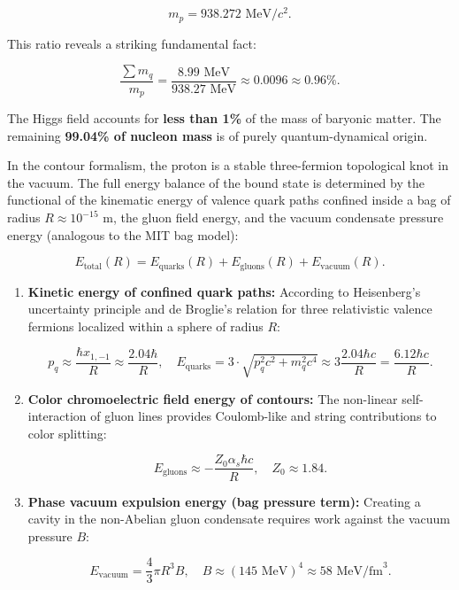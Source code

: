\documentclass[11pt,a4paper]{article}
\theoremstyle{definition}
\begin{document}
\begin{equation}\label{eq:2.3.41}\tag{2.3.41}
m_p = 938.272\text{ MeV}/c^2.
\end{equation}

This ratio reveals a striking fundamental fact:

\begin{equation}\label{eq:2.3.42}\tag{2.3.42}
\frac{\sum m_q}{m_p} = \frac{8.99\text{ MeV}}{938.27\text{ MeV}} \approx 0.0096 \approx 0.96\%.
\end{equation}

The Higgs field accounts for \textbf{less than 1\%} of the mass of baryonic matter. The remaining \textbf{99.04\% of nucleon mass} is of purely quantum-dynamical origin.

In the contour formalism, the proton is a stable three-fermion topological knot in the vacuum. The full energy balance of the bound state is determined by the functional of the kinematic energy of valence quark paths confined inside a bag of radius $R \approx 10^{-15}\text{ m}$, the gluon field energy, and the vacuum condensate pressure energy (analogous to the MIT bag model):

\begin{equation}\label{eq:2.3.43}\tag{2.3.43}
E_{\text{total}}(R) = E_{\text{quarks}}(R) + E_{\text{gluons}}(R) + E_{\text{vacuum}}(R).
\end{equation}

\begin{enumerate}
\item \textbf{Kinetic energy of confined quark paths:}  
According to Heisenberg's uncertainty principle and de Broglie's relation for three relativistic valence fermions localized within a sphere of radius $R$:

\begin{equation}\label{eq:2.3.44}\tag{2.3.44}
p_q \approx \frac{\hbar x_{1,-1}}{R} \approx \frac{2.04 \hbar}{R}, \quad E_{\text{quarks}} = 3 \cdot \sqrt{p_q^2 c^2 + m_q^2 c^4} \approx 3 \frac{2.04 \hbar c}{R} = \frac{6.12 \hbar c}{R}.
\end{equation}

\item \textbf{Color chromoelectric field energy of contours:}  
The non-linear self-interaction of gluon lines provides Coulomb-like and string contributions to color splitting:

\begin{equation}\label{eq:2.3.45}\tag{2.3.45}
E_{\text{gluons}} \approx - \frac{Z_0 \alpha_s \hbar c}{R}, \quad Z_0 \approx 1.84.
\end{equation}

\item \textbf{Phase vacuum expulsion energy (bag pressure term):}  
Creating a cavity in the non-Abelian gluon condensate requires work against the vacuum pressure $B$:

\begin{equation}\label{eq:2.3.46}\tag{2.3.46}
E_{\text{vacuum}} = \frac{4}{3}\pi R^3 B, \quad B \approx (145\text{ MeV})^4 \approx 58\text{ MeV/fm}^3.
\end{equation}
\end{enumerate}
\end{document}
